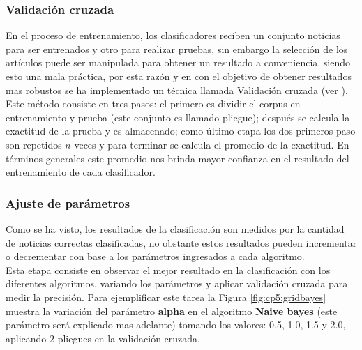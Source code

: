 
\subsubsection{Validación cruzada}

En el proceso de entrenamiento, los clasificadores reciben un conjunto noticias para ser entrenados y otro para realizar pruebas, sin embargo la selección de los artículos puede ser manipulada para obtener un resultado a conveniencia, siendo esto una mala práctica, por esta razón y en con el objetivo de obtener resultados mas robustos se ha implementado un técnica llamada Validación cruzada (ver ).\\

Este método consiste en tres pasos: el primero es dividir el corpus en entrenamiento y prueba (este conjunto es llamado pliegue); después se calcula la exactitud de la prueba y es almacenado; como último etapa los dos primeros paso son repetidos $n$ veces y para terminar  se calcula el promedio de la exactitud. En términos generales este promedio nos brinda mayor confianza en el resultado del entrenamiento de cada clasificador.\\


\subsubsection{Ajuste de parámetros}

Como se ha visto, los resultados de la clasificación son medidos por la cantidad de noticias correctas clasificadas, no obstante estos resultados pueden incrementar o decrementar con base a los parámetros ingresados a cada algoritmo.\\

Esta etapa consiste en observar el mejor resultado en la clasificación con los diferentes algoritmos, variando los parámetros y aplicar validación cruzada para medir la precisión. Para ejemplificar este tarea la Figura \ref{fig:cp5:gridbayes} muestra la variación del parámetro \textbf{alpha} en el algoritmo \textbf{Naive bayes} (este parámetro será explicado mas adelante) tomando los valores: 0.5, 1.0, 1.5 y 2.0, aplicando 2 pliegues en la validación cruzada.\\

